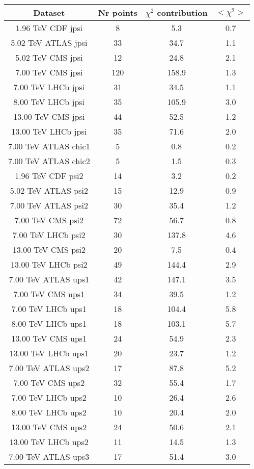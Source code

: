 \begin{table}[h!]
\centering
\begin{tabular}{c|c|c|c}
Dataset & Nr points & $\chi^2$ contribution & $<\chi^2>$ \\
\hline
1.96 TeV CDF jpsi & 8 & 5.3 & 0.7 \\
5.02 TeV ATLAS jpsi & 33 & 34.7 & 1.1 \\
5.02 TeV CMS jpsi & 12 & 24.8 & 2.1 \\
7.00 TeV CMS jpsi & 120 & 158.9 & 1.3 \\
7.00 TeV LHCb jpsi & 31 & 34.5 & 1.1 \\
8.00 TeV LHCb jpsi & 35 & 105.9 & 3.0 \\
13.00 TeV CMS jpsi & 44 & 52.5 & 1.2 \\
13.00 TeV LHCb jpsi & 35 & 71.6 & 2.0 \\
7.00 TeV ATLAS chic1 & 5 & 0.8 & 0.2 \\
7.00 TeV ATLAS chic2 & 5 & 1.5 & 0.3 \\
1.96 TeV CDF psi2 & 14 & 3.2 & 0.2 \\
5.02 TeV ATLAS psi2 & 15 & 12.9 & 0.9 \\
7.00 TeV ATLAS psi2 & 30 & 35.4 & 1.2 \\
7.00 TeV CMS psi2 & 72 & 56.7 & 0.8 \\
7.00 TeV LHCb psi2 & 30 & 137.8 & 4.6 \\
13.00 TeV CMS psi2 & 20 & 7.5 & 0.4 \\
13.00 TeV LHCb psi2 & 49 & 144.4 & 2.9 \\
7.00 TeV ATLAS ups1 & 42 & 147.1 & 3.5 \\
7.00 TeV CMS ups1 & 34 & 39.5 & 1.2 \\
7.00 TeV LHCb ups1 & 18 & 104.4 & 5.8 \\
8.00 TeV LHCb ups1 & 18 & 103.1 & 5.7 \\
13.00 TeV CMS ups1 & 24 & 54.9 & 2.3 \\
13.00 TeV LHCb ups1 & 20 & 23.7 & 1.2 \\
7.00 TeV ATLAS ups2 & 17 & 87.8 & 5.2 \\
7.00 TeV CMS ups2 & 32 & 55.4 & 1.7 \\
7.00 TeV LHCb ups2 & 10 & 26.4 & 2.6 \\
8.00 TeV LHCb ups2 & 10 & 20.4 & 2.0 \\
13.00 TeV CMS ups2 & 24 & 50.6 & 2.1 \\
13.00 TeV LHCb ups2 & 11 & 14.5 & 1.3 \\
7.00 TeV ATLAS ups3 & 17 & 51.4 & 3.0 \\

\end{tabular}
\end{table}
